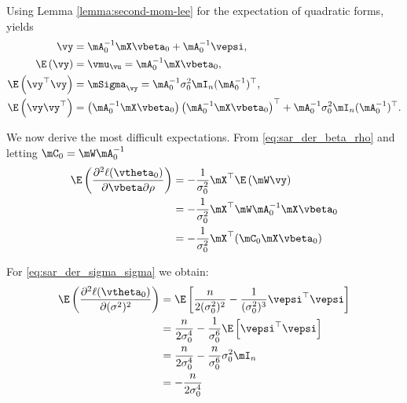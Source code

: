 \begin{subappendices}
Using Lemma \ref{lemma:second-mom-lee} for the expectation of quadratic forms, yields
\begin{equation}
\begin{aligned}
	\vy & =  \mA_0^{-1}\mX\vbeta_0 + \mA_0^{-1}\vepsi, \\
	\E\left(\vy\right)   & = \vmu_{\vu} = \mA_0^{-1}\mX\vbeta_0, \\
	\E\left(\vy^\top\vy\right) & = \mSigma_{\vy} = \mA_0^{-1}\sigma^2_0\mI_n(\mA_0^{-1})^\top, \\
	\E\left(\vy\vy^\top\right) & = \left(\mA_0^{-1}\mX\vbeta_0\right) \left(\mA_0^{-1}\mX\vbeta_0\right)^\top + \mA_0^{-1}\sigma^2_0\mI_n(\mA_0^{-1})^\top.
\end{aligned}
\end{equation}

We now derive the most difficult expectations. From \eqref{eq:sar_der_beta_rho} and letting $\mC_0 = \mW\mA^{-1}_0$
\begin{equation}\label{eq:E_der_beta_rho}
\begin{aligned}
\E\left(\frac{\partial^2  \ell(\vtheta_0)}{\partial \vbeta \partial \rho}\right) & = - \frac{1}{\sigma^2_0} \mX^\top\E\left(\mW\vy\right) \\
& = - \frac{1}{\sigma^2_0} \mX^\top\mW\mA^{-1}_0\mX\vbeta_0 \\
& = - \frac{1}{\sigma^2_0} \mX^\top(\mC_0\mX\vbeta_0)
\end{aligned}	
\end{equation}

For \eqref{eq:sar_der_sigma_sigma} we obtain:
\begin{equation}\label{eq:E_der_sigma_sigma}
  \begin{aligned}
\E\left(\frac{\partial^2 \ell(\vtheta_0)}{\partial (\sigma^2)^2}\right) & = \E\left[\frac{n}{2(\sigma^2_0) ^2} - \frac{1}{(\sigma^2_0)^3} \vepsi^\top \vepsi\right] \\
& = \frac{n}{2\sigma^4_0} - \frac{1}{\sigma^6_0}\E\left[\vepsi^\top \vepsi\right] \\
& = \frac{n}{2\sigma^4_0} - \frac{n}{\sigma^6_0} \sigma^2_0 \mI_n \\
& = - \frac{n}{2\sigma^4_0} 
  \end{aligned}
\end{equation}


\end{subappendices}
